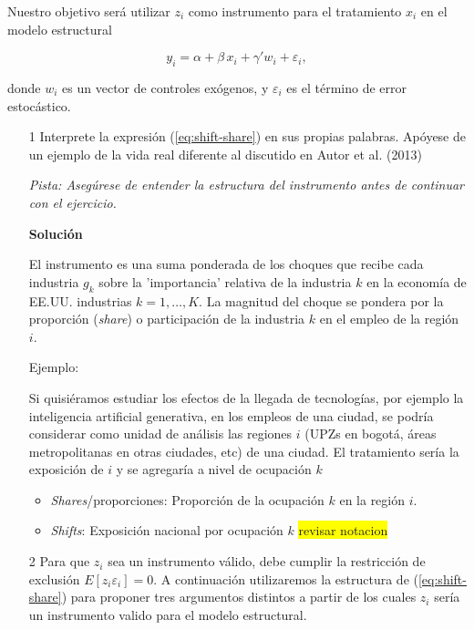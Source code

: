 \documentclass[a4paper, answers, addpoints, 11pt]{exam}
\newenvironment{solucion}{%
  \begin{mdframed}[
    backgroundcolor=blue!5,    %
    linecolor=blue!50,          %
    linewidth=2pt,              %
    leftmargin=10pt,            %
    rightmargin=8pt,           %
    topline=true,              %
    bottomline=true,            %
    roundcorner=10pt,           %
    innerleftmargin=10pt,       %
    innerrightmargin=10pt,      %
    innerbottommargin=10pt,     %
    innertopmargin=10pt         %
  ]%
  \begin{tcolorbox}[colframe=blue!50!black, colback=blue!50, coltitle=white, sharp corners=all, boxrule=1mm, width=\textwidth, halign=left, valign=center, top=0mm, bottom=0mm, left=0mm, right=0mm] \textbf{Solución} \end{tcolorbox} }{\end{mdframed}}
\begin{document}
Nuestro objetivo será utilizar \(z_i\) como instrumento para el tratamiento \(x_i\) en el modelo estructural

\[
y_i = \alpha +\beta\,x_i + \gamma' w_i + \varepsilon_i,
\]

donde \(w_i\) es un vector de controles exógenos, y \(\varepsilon_i\) es el término de error estocástico.

\begin{enumerate}
    \item[1] Interprete la expresión (\ref{eq:shift-share}) en sus propias palabras. Apóyese de un ejemplo de la vida real diferente al discutido en Autor et al. (2013)
    
    
    \textit{Pista: Asegúrese de entender la estructura del instrumento antes de continuar con el ejercicio.}
\begin{solucion}
El instrumento es una suma ponderada de los choques que recibe cada industria $g_k$ sobre la 'importancia'  relativa de la industria $k$ en la economía de EE.UU. industrias $k=1,\dots,K$. La magnitud del choque se pondera por la proporción (\textit{share}) o participación de la industria $k$ en el empleo de la región $i$. 

Ejemplo:

Si quisiéramos estudiar los efectos de la llegada de tecnologías, por ejemplo la inteligencia artificial generativa, en los empleos de una ciudad, se podría considerar como unidad de análisis las regiones $i$ (UPZs en bogotá, áreas metropolitanas en otras ciudades, etc) de una ciudad. El tratamiento sería la exposición de $i$ y se agregaría a nivel de ocupación $k$
\begin{itemize}
    \item \textit{Shares}/proporciones: Proporción de la ocupación $k$ en la región $i$.
    \item \textit{Shifts}: Exposición nacional por ocupación $k$
    \colorbox{yellow}{revisar notacion}
\end{itemize}

\end{solucion}

    \item[2] Para que $z_i$ sea un instrumento válido, debe cumplir la restricción de exclusión $E[z_i \varepsilon_i] = 0$. A continuación utilizaremos la estructura de (\ref{eq:shift-share}) para proponer tres argumentos distintos a partir de los cuales $z_i$ sería un instrumento valido para el modelo estructural. \\
        

\end{enumerate}
\end{document}

